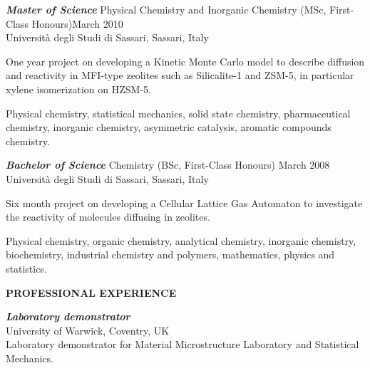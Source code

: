 \documentclass[a4paper,11pt,final]{memoir}
\newcommand{\Sep}{\vspace{1.em}}
\newcommand{\SmallSep}{\vspace{0.2em}}
\newcommand{\CVSection}[1]
	{\Large\textbf{#1}\par
	\SmallSep\normalsize\normalfont}
\newcommand{\CVItem}[2]
	{\textit{\textbf{\color{RoyalBlue} #1}} #2}
\begin{document}
\CVItem{Master of Science}{Physical Chemistry and Inorganic Chemistry (MSc, First-Class Honours)\hfill March 2010}\\
Universit\`a degli Studi di Sassari, Sassari, Italy %
\begin{description} [style=multiline,leftmargin=3cm,font=\normalfont] \itemsep -1.5pt
\item [Thesis:] One year project on developing a Kinetic Monte Carlo model to describe
  diffusion and reactivity in MFI-type zeolites such as Silicalite-1 and ZSM-5, in
  particular xylene
  isomerization on HZSM-5.
\item[Main subjects:] Physical chemistry, statistical mechanics, solid state chemistry,
  pharmaceutical chemistry, inorganic chemistry, asymmetric catalysis, aromatic compounds
  chemistry. 
\end{description}
\SmallSep
 
\CVItem{Bachelor of Science}{Chemistry (BSc, First-Class Honours) \hfill  March 2008}\\
Universit\`a degli Studi di Sassari, Sassari, Italy %
\begin{description} [style=multiline,leftmargin=3cm,font=\normalfont] \itemsep -1.5pt
\item [Thesis:] Six month project on developing a Cellular Lattice Gas Automaton to investigate
the reactivity of molecules diffusing in zeolites.
\item[Main subjects:] Physical chemistry, organic chemistry, analytical chemistry,
  inorganic chemistry, biochemistry, industrial chemistry and polymers, mathematics,
  physics and statistics.
\end{description}


\Sep
\CVSection{PROFESSIONAL EXPERIENCE} 
\CVItem{Laboratory demonstrator} \\ %
University of Warwick, Coventry, UK  \\
Laboratory demonstrator for Material Microstructure Laboratory and Statistical Mechanics. 
\end{document}
